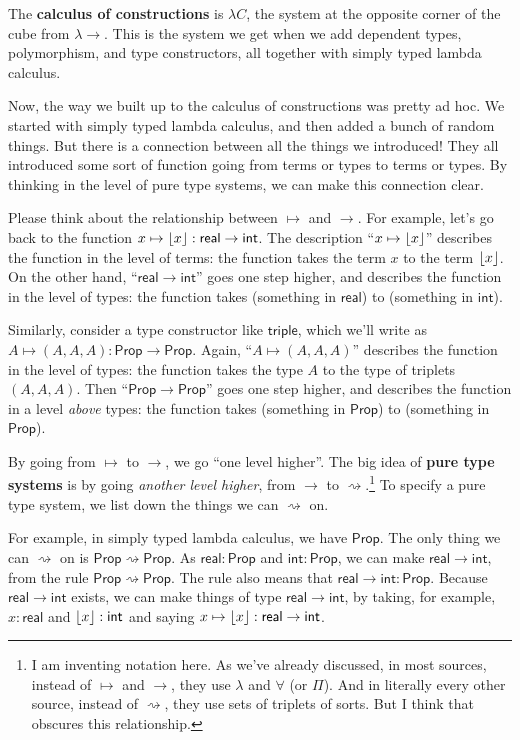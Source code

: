 \documentclass[11pt,paper=letter]{scrartcl}
\newcommand{\sf}{\mathsf}
\newcommand{\prop}{\mathsf{Prop}}
\newcommand{\toto}{\rightsquigarrow}
\begin{document}
The \textbf{calculus of constructions} is $\lambda C$, the system at the opposite corner of the cube from $\lambda \to$. This is the system we get when we add dependent types, polymorphism, and type constructors, all together with simply typed lambda calculus.

Now, the way we built up to the calculus of constructions was pretty ad hoc. We started with simply typed lambda calculus, and then added a bunch of random things. But there is a connection between all the things we introduced! They all introduced some sort of function going from terms or types to terms or types. By thinking in the level of pure type systems, we can make this connection clear.

Please think about the relationship between $\mapsto$ and $\to$. For example, let's go back to the function $x \mapsto \floor{x} : \sf{real} \to \sf{int}$. The description ``$x \mapsto \left\lfloor x \right\rfloor$'' describes the function in the level of terms: the function takes the term $x$ to the term $\left\lfloor x \right\rfloor$. On the other hand, ``$\sf{real} \to \sf{int}$'' goes one step higher, and describes the function in the level of types: the function takes (something in $\sf{real}$) to (something in $\sf{int}$).

Similarly, consider a type constructor like $\sf{triple}$, which we'll write as $A \mapsto (A, A, A) : \prop \to \prop$. Again, ``$A \mapsto (A, A, A)$'' describes the function in the level of types: the function takes the type $A$ to the type of triplets $(A, A, A)$. Then ``$\prop \to \prop$'' goes one step higher, and describes the function in a level \emph{above} types: the function takes (something in $\prop$) to (something in $\prop$).

By going from $\mapsto$ to $\to$, we go ``one level higher''. The big idea of \textbf{pure type systems} is by going \emph{another level higher}, from $\to$ to $\toto$.\footnote{I am inventing notation here. As we've already discussed, in most sources, instead of $\mapsto$ and $\to$, they use $\lambda$ and $\forall$ (or $\Pi$). And in literally every other source, instead of $\toto$, they use sets of triplets of sorts. But I think that obscures this relationship.} To specify a pure type system, we list down the things we can $\toto$ on.

For example, in simply typed lambda calculus, we have $\prop$. The only thing we can $\toto$ on is $\prop \toto \prop$. As $\sf{real}: \prop$ and $\sf{int}: \prop$, we can make $\sf{real} \to \sf{int}$, from the rule $\prop \toto \prop$. The rule also means that $\sf{real} \to \sf{int}: \prop$. Because $\sf{real} \to \sf{int}$ exists, we can make things of type $\sf{real} \to \sf{int}$, by taking, for example, $x: \sf{real}$ and $\floor{x}: \sf{int}$ and saying $x \mapsto \floor{x} : \sf{real} \to \sf{int}$.
\end{document}
